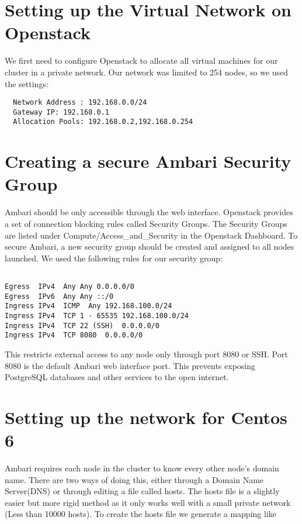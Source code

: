 \documentclass[9pt,twocolumn,twoside]{idsi}
\begin{document}
\section{Setting up the Virtual Network on Openstack}
We first need to configure Openstack to allocate all virtual machines for our cluster in a private network. Our network was limited to 254 nodes, so we used the settings:

\begin{verbatim}
  Network Address : 192.168.0.0/24
  Gateway IP: 192.168.0.1
  Allocation Pools: 192.168.0.2,192.168.0.254
\end{verbatim}

\section{Creating a secure Ambari Security Group}
Ambari should be only accessible through the web interface. Openstack provides a set of connection blocking rules called Security Groups. The Security Groups are listed under Compute/Access\_and\_Security in the Openstack Dashboard. To secure Ambari, a new security group should be created and assigned to all nodes launched. We used the following rules for our security group:

\begin{verbatim}

Egress  IPv4  Any Any 0.0.0.0/0
Egress  IPv6  Any Any ::/0 
Ingress IPv4  ICMP  Any 192.168.100.0/24 
Ingress IPv4  TCP 1 - 65535 192.168.100.0/24 
Ingress IPv4  TCP 22 (SSH)  0.0.0.0/0
Ingress IPv4  TCP 8080  0.0.0.0/0

\end{verbatim}

This restricts external access to any node only through port 8080 or SSH. Port 8080 is the default Ambari web interface port. This prevents exposing PostgreSQL databases and other services to the open internet. 

\section{Setting up the network for Centos 6}
\label{sec:network}

Ambari requires each node in the cluster to know every other node's domain name. There are two ways of doing this, either through a Domain Name Server(DNS) or through editing a file called hosts. The hosts file is a slightly easier but more rigid method as it only works well with a small private network (Less than 10000 hosts). To create the hosts file we generate a mapping like
\end{document}
